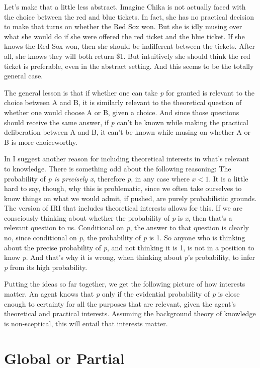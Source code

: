 \documentclass[11pt,oneside]{book}
\begin{document}
Let's make that a little less abstract. Imagine Chika is not actually faced with the choice between the red and blue tickets. In fact, she has no practical decision to make that turns on whether the Red Sox won. But she is idly musing over what she would do if she were offered the red ticket and the blue ticket. If she knows the Red Sox won, then she should be indifferent between the tickets. After all, she knows they will both return \$1. But intuitively she should think the red ticket is preferable, even in the abstract setting. And this seems to be the totally general case.

The general lesson is that if whether one can take \emph{p} for granted is relevant to the choice between A and B, it is similarly relevant to the theoretical question of whether one would choose A or B, given a choice. And since those questions should receive the same answer, if \emph{p} can't be known while making the practical deliberation between A and B, it can't be known while musing on whether A or B is more choiceworthy. 

In  \citet{Weatherson2012} I suggest another reason for including theoretical interests in what's relevant to knowledge. There is something odd about the following reasoning: The probability of \emph{p is precisely x}, therefore \emph{p}, in any case where $x < 1$. It is a little hard to say, though, why this is problematic, since we often take ourselves to know things on what we would admit, if pushed, are purely probabilistic grounds. The version of IRI that includes theoretical interests allows for this. If we are consciously thinking about whether the probability of \emph{p} is \emph{x}, then that's a relevant question to us. Conditional on \emph{p}, the answer to that question is clearly no, since conditional on \emph{p}, the probability of \emph{p} is 1. So anyone who is thinking about the precise probability of \emph{p}, and not thinking it is 1, is not in a position to know \emph{p}. And that's why it is wrong, when thinking about \emph{p}'s probability, to infer \emph{p} from its high probability.

Putting the ideas so far together, we get the following picture of how interests matter. An agent knows that \emph{p} only if the evidential probability of \emph{p} is close enough to certainty for all the purposes that are relevant, given the agent's theoretical and practical interests. Assuming the background theory of knowledge is non-sceptical, this will entail that interests matter.

\section{Global or Partial}
\label{globalorpartial}
\end{document}
